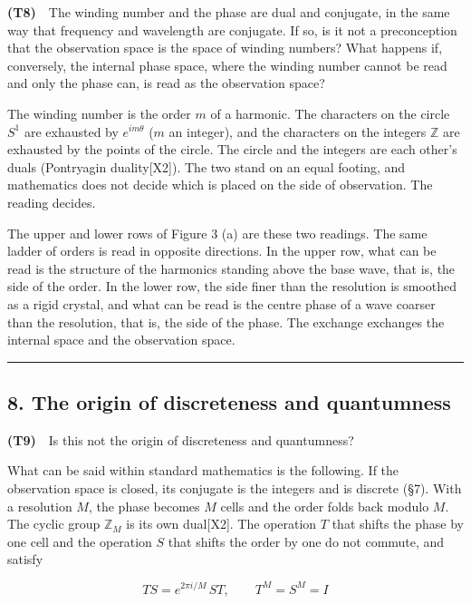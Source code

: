 \documentclass[
  a4paper,
]{article}
\begin{document}
\textbf{(T8)}　The winding number and the phase are dual and conjugate,
in the same way that frequency and wavelength are conjugate. If so, is
it not a preconception that the observation space is the space of
winding numbers? What happens if, conversely, the internal phase space,
where the winding number cannot be read and only the phase can, is read
as the observation space?

The winding number is the order \(m\) of a harmonic. The characters on
the circle \(S^1\) are exhausted by \(e^{im\theta}\) (\(m\) an integer),
and the characters on the integers \(\mathbb{Z}\) are exhausted by the
points of the circle. The circle and the integers are each other's duals
(Pontryagin duality{[}X2{]}). The two stand on an equal footing, and
mathematics does not decide which is placed on the side of observation.
The reading decides.

The upper and lower rows of Figure 3 (a) are these two readings. The
same ladder of orders is read in opposite directions. In the upper row,
what can be read is the structure of the harmonics standing above the
base wave, that is, the side of the order. In the lower row, the side
finer than the resolution is smoothed as a rigid crystal, and what can
be read is the centre phase of a wave coarser than the resolution, that
is, the side of the phase. The exchange exchanges the internal space and
the observation space.

\begin{center}\rule{0.5\linewidth}{0.5pt}\end{center}

\subsection{8. The origin of discreteness and
quantumness}\label{the-origin-of-discreteness-and-quantumness}

\textbf{(T9)}　Is this not the origin of discreteness and quantumness?

What can be said within standard mathematics is the following. If the
observation space is closed, its conjugate is the integers and is
discrete (§7). With a resolution \(M\), the phase becomes \(M\) cells
and the order folds back modulo \(M\). The cyclic group \(\mathbb{Z}_M\)
is its own dual{[}X2{]}. The operation \(T\) that shifts the phase by
one cell and the operation \(S\) that shifts the order by one do not
commute, and satisfy

\[
TS=e^{2\pi i/M}\,ST,\qquad T^{M}=S^{M}=I
\]
\end{document}

